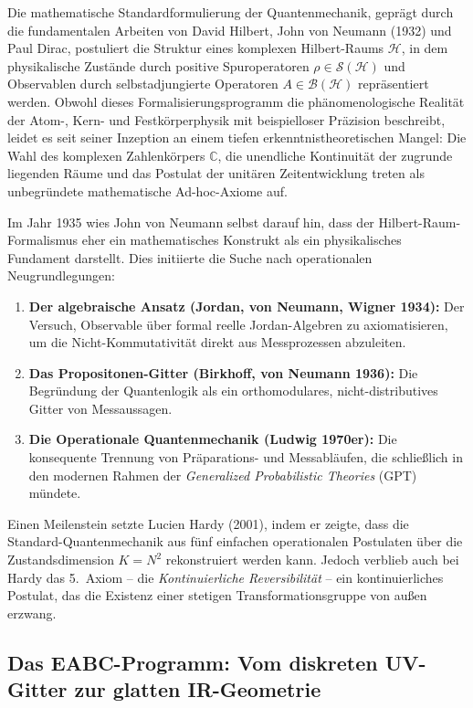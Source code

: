 \documentclass[11pt,a4paper]{article}
\begin{document}
Die mathematische Standardformulierung der Quantenmechanik, geprägt durch die fundamentalen Arbeiten von David Hilbert, John von Neumann (1932) und Paul Dirac, postuliert die Struktur eines komplexen Hilbert-Raums $\mathcal{H}$, in dem physikalische Zustände durch positive Spuroperatoren $\rho \in \mathcal{S}(\mathcal{H})$ und Observablen durch selbstadjungierte Operatoren $A \in \mathcal{B}(\mathcal{H})$ repräsentiert werden. Obwohl dieses Formalisierungsprogramm die phänomenologische Realität der Atom-, Kern- und Festkörperphysik mit beispielloser Präzision beschreibt, leidet es seit seiner Inzeption an einem tiefen erkenntnistheoretischen Mangel: Die Wahl des komplexen Zahlenkörpers $\mathbb{C}$, die unendliche Kontinuität der zugrunde liegenden Räume und das Postulat der unitären Zeitentwicklung treten als unbegründete mathematische Ad-hoc-Axiome auf.

Im Jahr 1935 wies John von Neumann selbst darauf hin, dass der Hilbert-Raum-Formalismus eher ein mathematisches Konstrukt als ein physikalisches Fundament darstellt. Dies initiierte die Suche nach operationalen Neugrundlegungen:
\begin{enumerate}
    \item \textbf{Der algebraische Ansatz (Jordan, von Neumann, Wigner 1934):} Der Versuch, Observable über formal reelle Jordan-Algebren zu axiomatisieren, um die Nicht-Kommutativität direkt aus Messprozessen abzuleiten.
    \item \textbf{Das Propositonen-Gitter (Birkhoff, von Neumann 1936):} Die Begründung der Quantenlogik als ein orthomodulares, nicht-distributives Gitter von Messaussagen.
    \item \textbf{Die Operationale Quantenmechanik (Ludwig 1970er):} Die konsequente Trennung von Präparations- und Messabläufen, die schließlich in den modernen Rahmen der \emph{Generalized Probabilistic Theories} (GPT) mündete.
\end{enumerate}

Einen Meilenstein setzte Lucien Hardy (2001), indem er zeigte, dass die Standard-Quantenmechanik aus fünf einfachen operationalen Postulaten über die Zustandsdimension $K = N^2$ rekonstruiert werden kann. Jedoch verblieb auch bei Hardy das 5.\ Axiom -- die \emph{Kontinuierliche Reversibilität} -- ein kontinuierliches Postulat, das die Existenz einer stetigen Transformationsgruppe von außen erzwang.

\subsection{Das EABC-Programm: Vom diskreten UV-Gitter zur glatten IR-Geometrie}
\end{document}
